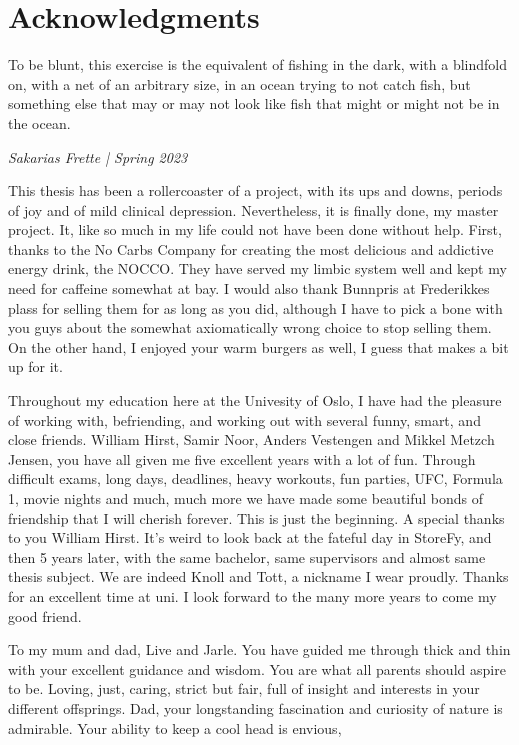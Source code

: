 \chapter*{Acknowledgments}



\epigraph{
    To be blunt, this exercise is the equivalent of fishing in the dark, 
    with a blindfold on, with a net of an arbitrary size, 
in an ocean trying to not catch fish, but something else 
that may or may not look like fish that might or might not be in the ocean.}{\textit{Sakarias Frette | Spring 2023}}

This thesis has been a rollercoaster of a project, with its ups and downs, periods of joy and of mild 
clinical depression.
Nevertheless, it is finally done, my master project. It, like so much in my life could not have been 
done without help. 
First, thanks to the No Carbs Company for creating the most delicious and addictive energy drink, 
the NOCCO. They have 
served my limbic system well and kept my need for caffeine somewhat at bay. I would also thank Bunnpris 
at Frederikkes plass 
for selling them for as long as you did, although I have to pick a bone with you guys about the somewhat axiomatically 
wrong choice to stop selling them. On the other hand, I enjoyed your warm burgers as well, I guess that makes a bit up for it. \par 
Throughout my education here at the Univesity of Oslo, I have had the pleasure of working with, befriending, 
and working out with several funny, smart, and close friends. William Hirst, Samir Noor, Anders Vestengen and 
Mikkel Metzch Jensen, you have all given me five excellent years with a lot of fun. Through difficult exams, long days, deadlines, 
heavy workouts, fun parties, UFC, Formula 1, movie nights and much, much more we have made some beautiful bonds of friendship 
that I will cherish forever. This is just the beginning. A special thanks to you William Hirst. It's weird to look back at the fateful day
in StoreFy, and then 5 years later, with the same bachelor, same supervisors and almost same thesis subject. We are indeed Knoll and Tott, 
a nickname I wear proudly. Thanks for an excellent time at uni. I look forward to the many more years to come my good friend. \par 
To my mum and dad, Live and Jarle. You have guided me through thick and thin with your excellent guidance and wisdom. 
You are what all parents should aspire to be. Loving, just, caring, strict but fair, full of insight and interests in your 
different offsprings. Dad, your longstanding fascination and curiosity of nature  is admirable. Your ability to keep a cool head is envious, 
